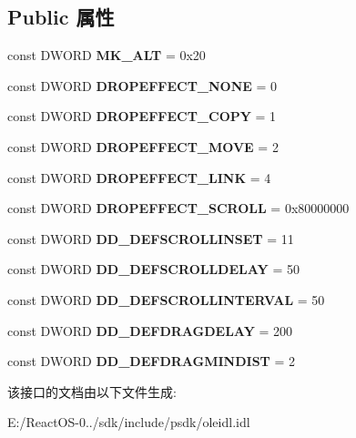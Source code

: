 \subsection*{Public 属性}
\begin{DoxyCompactItemize}
\item 
\mbox{\label{interface_i_drop_target_a69ff1e9a2a342b7f22d2a3d1fa40cd0d}} 
const D\+W\+O\+RD {\bfseries M\+K\+\_\+\+A\+LT} = 0x20
\item 
\mbox{\label{interface_i_drop_target_a5773eb1094fd2c16596bcc4514a394a8}} 
const D\+W\+O\+RD {\bfseries D\+R\+O\+P\+E\+F\+F\+E\+C\+T\+\_\+\+N\+O\+NE} = 0
\item 
\mbox{\label{interface_i_drop_target_a895da35c263c91508415f11a1d0dfa74}} 
const D\+W\+O\+RD {\bfseries D\+R\+O\+P\+E\+F\+F\+E\+C\+T\+\_\+\+C\+O\+PY} = 1
\item 
\mbox{\label{interface_i_drop_target_a9f6a31016c6c118aa5b29749e6494501}} 
const D\+W\+O\+RD {\bfseries D\+R\+O\+P\+E\+F\+F\+E\+C\+T\+\_\+\+M\+O\+VE} = 2
\item 
\mbox{\label{interface_i_drop_target_a867c8ffc1c9d4688bc91b7eb8c6aaa05}} 
const D\+W\+O\+RD {\bfseries D\+R\+O\+P\+E\+F\+F\+E\+C\+T\+\_\+\+L\+I\+NK} = 4
\item 
\mbox{\label{interface_i_drop_target_a697c040cdec772733643a7a196ee6d0a}} 
const D\+W\+O\+RD {\bfseries D\+R\+O\+P\+E\+F\+F\+E\+C\+T\+\_\+\+S\+C\+R\+O\+LL} = 0x80000000
\item 
\mbox{\label{interface_i_drop_target_a0025f4ea4c35d082c380a083a64435be}} 
const D\+W\+O\+RD {\bfseries D\+D\+\_\+\+D\+E\+F\+S\+C\+R\+O\+L\+L\+I\+N\+S\+ET} = 11
\item 
\mbox{\label{interface_i_drop_target_a645802149bf3244695b92512fb12c238}} 
const D\+W\+O\+RD {\bfseries D\+D\+\_\+\+D\+E\+F\+S\+C\+R\+O\+L\+L\+D\+E\+L\+AY} = 50
\item 
\mbox{\label{interface_i_drop_target_a9537c4f70f2564eeacf6c20431aeda6d}} 
const D\+W\+O\+RD {\bfseries D\+D\+\_\+\+D\+E\+F\+S\+C\+R\+O\+L\+L\+I\+N\+T\+E\+R\+V\+AL} = 50
\item 
\mbox{\label{interface_i_drop_target_a03253f31e5a2faf2f8197b5337a9fd6a}} 
const D\+W\+O\+RD {\bfseries D\+D\+\_\+\+D\+E\+F\+D\+R\+A\+G\+D\+E\+L\+AY} = 200
\item 
\mbox{\label{interface_i_drop_target_aa94cb21803c3947890d45e527cf24c87}} 
const D\+W\+O\+RD {\bfseries D\+D\+\_\+\+D\+E\+F\+D\+R\+A\+G\+M\+I\+N\+D\+I\+ST} = 2
\end{DoxyCompactItemize}


该接口的文档由以下文件生成\+:\begin{DoxyCompactItemize}
\item 
E\+:/\+React\+O\+S-\/0../sdk/include/psdk/oleidl.\+idl\end{DoxyCompactItemize}
